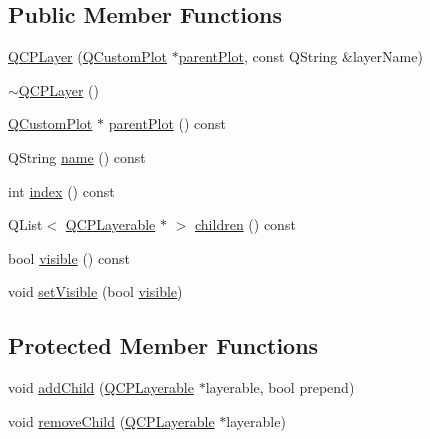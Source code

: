 \subsection*{Public Member Functions}
\begin{DoxyCompactItemize}
\item 
\hyperlink{classQCPLayer_a5d0657fc86d624e5efbe930ef21af718}{Q\+C\+P\+Layer} (\hyperlink{classQCustomPlot}{Q\+Custom\+Plot} $\ast$\hyperlink{classQCPLayer_a3958c9a938c2d05a7378c41484acee08}{parent\+Plot}, const Q\+String \&layer\+Name)
\item 
\hyperlink{classQCPLayer_afc1a8940f8e34c9f25ead9dfd4828cae}{$\sim$\+Q\+C\+P\+Layer} ()
\item 
\hyperlink{classQCustomPlot}{Q\+Custom\+Plot} $\ast$ \hyperlink{classQCPLayer_a3958c9a938c2d05a7378c41484acee08}{parent\+Plot} () const 
\item 
Q\+String \hyperlink{classQCPLayer_a96ebd1e436f3813938cb9cd4a59a60be}{name} () const 
\item 
int \hyperlink{classQCPLayer_ad5d7010829a6b99f326b07d7e37c8c99}{index} () const 
\item 
Q\+List$<$ \hyperlink{classQCPLayerable}{Q\+C\+P\+Layerable} $\ast$ $>$ \hyperlink{classQCPLayer_a94c2f0100e48cefad2de8fe0fbb03c27}{children} () const 
\item 
bool \hyperlink{classQCPLayer_a9efca636e4dcad721999a6282f296016}{visible} () const 
\item 
void \hyperlink{classQCPLayer_ac07671f74edf6884b51a82afb2c19516}{set\+Visible} (bool \hyperlink{classQCPLayer_a9efca636e4dcad721999a6282f296016}{visible})
\end{DoxyCompactItemize}
\subsection*{Protected Member Functions}
\begin{DoxyCompactItemize}
\item 
void \hyperlink{classQCPLayer_a57ce5e49364aa9122276d5df3b4a0ddc}{add\+Child} (\hyperlink{classQCPLayerable}{Q\+C\+P\+Layerable} $\ast$layerable, bool prepend)
\item 
void \hyperlink{classQCPLayer_ac2f64ac7761650582d968d86670ef362}{remove\+Child} (\hyperlink{classQCPLayerable}{Q\+C\+P\+Layerable} $\ast$layerable)
\end{DoxyCompactItemize}
